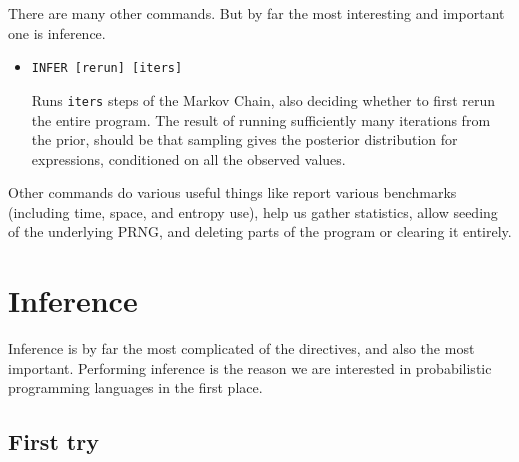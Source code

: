 \documentclass[10pt]{article}
\begin{document}
\noindent There are many other commands.  But by far the most interesting and important one is inference.
\begin{itemize}
\item {\tt INFER [rerun] [iters]} 

Runs {\tt iters} steps of the Markov Chain, also deciding whether to first rerun the entire program.  The result of running sufficiently many iterations from the prior, should be that sampling gives the posterior distribution for expressions, conditioned on all the observed values.  

\end{itemize}

\noindent Other commands do various useful things like report various benchmarks (including time, space, and entropy use), help us gather statistics, allow seeding of the underlying PRNG, and deleting parts of the program or clearing it entirely.  



\section{Inference}

Inference is by far the most complicated of the directives, and also the most important.  Performing inference is the reason we are interested in probabilistic programming languages in the first place.  




%



\subsection{First try}
\end{document}
